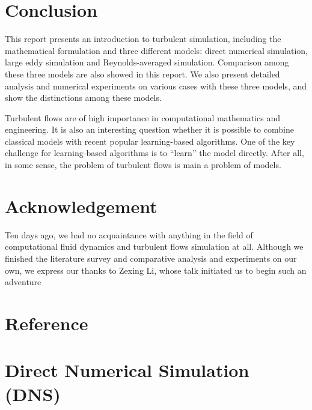 \documentclass[english, nochinese]{pkupaper}
\begin{document}
\section{Conclusion} \label{Sec:Con}

This report presents an introduction to turbulent simulation, including the mathematical formulation and three different models: direct numerical simulation, large eddy simulation and Reynolds-averaged simulation. Comparison among these three models are also showed in this report. We also present detailed analysis and numerical experiments on various cases with these three models, and show the distinctions among these models.

Turbulent flows are of high importance in computational mathematics and engineering. It is also an interesting question whether it is possible to combine classical models with recent popular learning-based algorithms. One of the key challenge for learning-based algorithms is to ``learn'' the model directly. After all, in some sense, the problem of turbulent flows is main a problem of models.

\section{Acknowledgement} \label{Sec:Ack}

Ten days ago, we had no acquaintance with anything in the field of computational fluid dynamics and turbulent flows simulation at all. Although we finished the literature survey and comparative analysis and experiments on our own, we express our thanks to Zexing Li, whose talk initiated us to begin such an adventure

\section{Reference}

\printbibliography

\section{Direct Numerical Simulation (DNS)}
\end{document}
